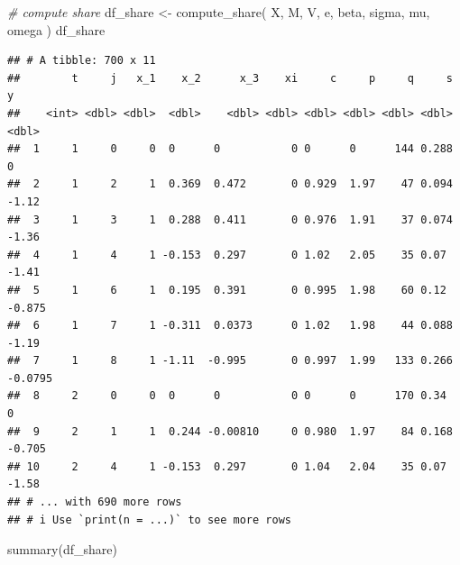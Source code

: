 \documentclass[
]{book}
\newenvironment{Shaded}{\begin{snugshade}}{\end{snugshade}}
\newcommand{\CommentTok}[1]{\textcolor[rgb]{0.56,0.35,0.01}{\textit{#1}}}
\newcommand{\FunctionTok}[1]{\textcolor[rgb]{0.00,0.00,0.00}{#1}}
\newcommand{\NormalTok}[1]{#1}
\newcommand{\OtherTok}[1]{\textcolor[rgb]{0.56,0.35,0.01}{#1}}
\begin{document}
\begin{Shaded}
\begin{Highlighting}[]
\CommentTok{\# compute share}
\NormalTok{df\_share }\OtherTok{\textless{}{-}}
  \FunctionTok{compute\_share}\NormalTok{(}
\NormalTok{    X, }
\NormalTok{    M, }
\NormalTok{    V, }
\NormalTok{    e, }
\NormalTok{    beta, }
\NormalTok{    sigma, }
\NormalTok{    mu, }
\NormalTok{    omega}
\NormalTok{    )}
\NormalTok{df\_share}
\end{Highlighting}
\end{Shaded}

\begin{verbatim}
## # A tibble: 700 x 11
##        t     j   x_1    x_2      x_3    xi     c     p     q     s       y
##    <int> <dbl> <dbl>  <dbl>    <dbl> <dbl> <dbl> <dbl> <dbl> <dbl>   <dbl>
##  1     1     0     0  0      0           0 0      0      144 0.288  0     
##  2     1     2     1  0.369  0.472       0 0.929  1.97    47 0.094 -1.12  
##  3     1     3     1  0.288  0.411       0 0.976  1.91    37 0.074 -1.36  
##  4     1     4     1 -0.153  0.297       0 1.02   2.05    35 0.07  -1.41  
##  5     1     6     1  0.195  0.391       0 0.995  1.98    60 0.12  -0.875 
##  6     1     7     1 -0.311  0.0373      0 1.02   1.98    44 0.088 -1.19  
##  7     1     8     1 -1.11  -0.995       0 0.997  1.99   133 0.266 -0.0795
##  8     2     0     0  0      0           0 0      0      170 0.34   0     
##  9     2     1     1  0.244 -0.00810     0 0.980  1.97    84 0.168 -0.705 
## 10     2     4     1 -0.153  0.297       0 1.04   2.04    35 0.07  -1.58  
## # ... with 690 more rows
## # i Use `print(n = ...)` to see more rows
\end{verbatim}

\begin{Shaded}
\begin{Highlighting}[]
\FunctionTok{summary}\NormalTok{(df\_share)}
\end{Highlighting}
\end{Shaded}
\end{document}

